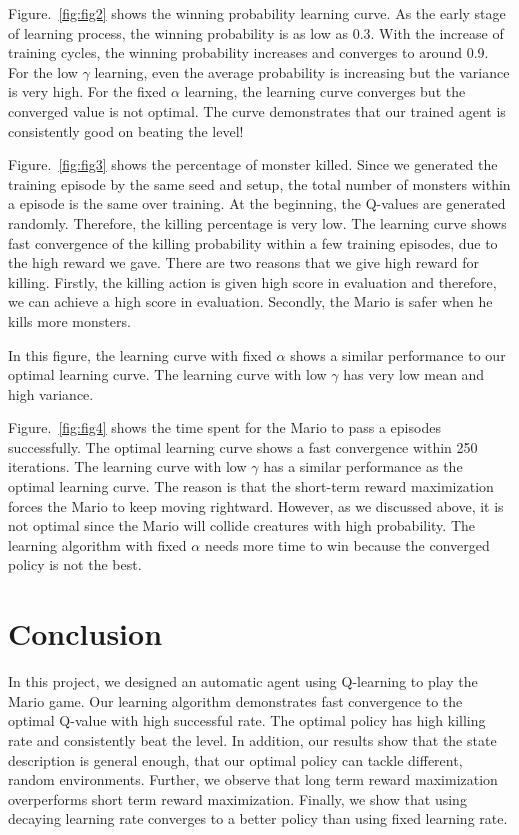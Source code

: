 Figure.~\ref{fig:fig2} shows the winning probability learning curve. As the early stage of learning process, the winning probability is as low as 0.3. With the increase of training cycles, the winning probability increases and converges to around 0.9. For the low $\gamma$ learning, even the average probability is increasing but the variance is very high. For the fixed $\alpha$ learning, the learning curve converges but the converged value is not optimal. The curve demonstrates that our trained agent is consistently good on beating the level!

Figure.~\ref{fig:fig3} shows the percentage of monster killed. Since we generated the training episode by the same seed and setup, the total number of monsters within a episode is the same over training. At the beginning, the Q-values are generated randomly. Therefore, the killing percentage is very low. The learning curve shows fast convergence of the killing probability within a few training episodes, due to the high reward we gave. There are two reasons that we give high reward for killing. Firstly, the killing action is given high score in evaluation and therefore, we can achieve a high score in evaluation.  Secondly, the Mario is safer when he kills more monsters. 

In this figure, the learning curve with fixed $\alpha$ shows a similar performance to our optimal learning curve. The learning curve with low $\gamma$ has very low mean and high variance.


Figure.~\ref{fig:fig4} shows the time spent for the Mario to pass a episodes successfully. The optimal learning curve shows a fast convergence within 250 iterations. The learning curve with low $\gamma$ has a similar performance as the optimal learning curve. The reason is that the short-term reward maximization forces the Mario to keep moving rightward. However, as we discussed above, it is not optimal since the Mario will collide creatures with high probability. The learning algorithm with fixed $\alpha$ needs more time to win because the converged policy is not the best.


\section{Conclusion}
In this project, we designed an automatic agent using Q-learning to play the Mario game. Our learning algorithm demonstrates fast convergence to the optimal Q-value with high successful rate. The optimal policy has high killing rate and consistently beat the level. In addition, our results show that the state description is general enough, that our optimal policy can tackle different, random environments. Further, we observe that long term reward maximization overperforms short term reward maximization. Finally, we show that using decaying learning rate converges to a better policy than using fixed learning rate.

